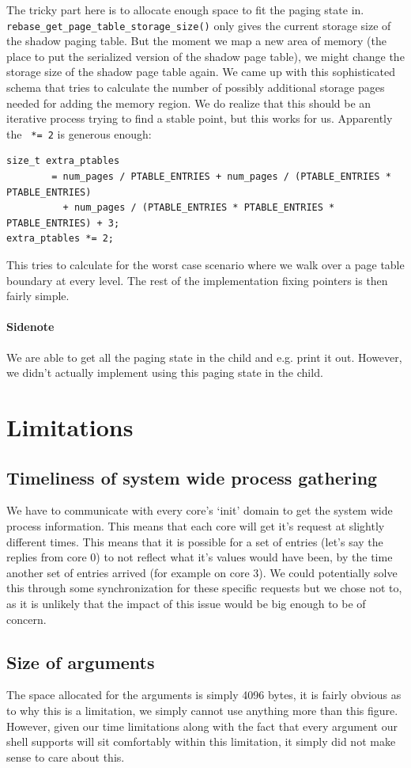 The tricky part here is to allocate enough space to fit the paging state in. \texttt{rebase_get_page_table_storage_size()} only gives the current storage size of the shadow paging table. But the moment we map a new area of memory (the place to put the serialized version of the shadow page table), we might change the storage size of the shadow page table again. We came up with this sophisticated schema that tries to calculate the number of possibly additional storage pages needed for adding the memory region. We do realize that this should be an iterative process trying to find a stable point, but this works for us. Apparently the \texttt{ *= 2} is generous enough:
\begin{verbatim}
size_t extra_ptables
        = num_pages / PTABLE_ENTRIES + num_pages / (PTABLE_ENTRIES * PTABLE_ENTRIES)
          + num_pages / (PTABLE_ENTRIES * PTABLE_ENTRIES * PTABLE_ENTRIES) + 3;
extra_ptables *= 2;
\end{verbatim}
This tries to calculate for the worst case scenario where we walk over a page table boundary at every level. The rest of the implementation fixing pointers is then fairly simple.

\paragraph{Sidenote}
We are able to get all the paging state in the child and e.g. print it out. However, we didn't actually implement using this paging state in the child.


\section{Limitations}
\subsection{Timeliness of system wide process gathering}
We have to communicate with every core's `init' domain to get the system wide process information. This means that 
each core will get it's request at slightly different times. This means that it is possible 
for a set of entries (let's say the replies from core 0) to not reflect what it's values would have been, by the time another set of entries arrived (for example on core 3). We could potentially solve this through some synchronization for these specific requests but we chose not to, as it is unlikely that the impact of this issue would be big enough to be of concern. 

\subsection{Size of arguments}
The space allocated for the arguments is simply 4096 bytes, it is fairly obvious as to why this is a limitation, we simply cannot use anything 
more than this figure. However, given our time limitations along with the fact that every argument our shell supports will sit comfortably within this limitation, it simply did not make sense to care about this. 